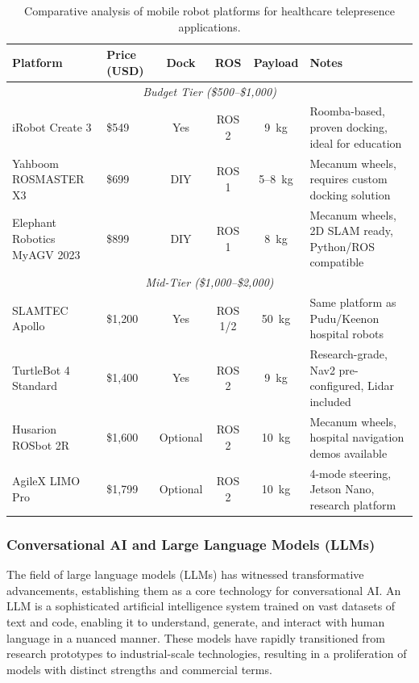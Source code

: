 \begin{table}[H]
\centering
\footnotesize
\begin{tabular}{|p{3.2cm}|l|c|c|c|p{4.5cm}|}
\hline
\textbf{Platform} & \textbf{Price (USD)} & \textbf{Dock} & \textbf{ROS} & \textbf{Payload} & \textbf{Notes} \\
\hline
\multicolumn{6}{|c|}{\textit{Budget Tier (\$500--\$1,000)}} \\
\hline
iRobot Create 3 \cite{irobot2024create3} & \$549 & Yes & ROS 2 & 9~kg & Roomba-based, proven docking, ideal for education \\
\hline
Yahboom ROSMASTER X3 \cite{yahboom2024} & \$699 & DIY & ROS 1 & 5--8~kg & Mecanum wheels, requires custom docking solution \\
\hline
Elephant Robotics MyAGV 2023 \cite{elephantrobotics2024} & \$899 & DIY & ROS 1 & 8~kg & Mecanum wheels, 2D SLAM ready, Python/ROS compatible \\
\hline
\multicolumn{6}{|c|}{\textit{Mid-Tier (\$1,000--\$2,000)}} \\
\hline
SLAMTEC Apollo \cite{slamtec2024} & \$1,200 & Yes & ROS 1/2 & 50~kg & Same platform as Pudu/Keenon hospital robots \\
\hline
TurtleBot 4 Standard \cite{turtlebot2024} & \$1,400 & Yes & ROS 2 & 9~kg & Research-grade, Nav2 pre-configured, Lidar included \\
\hline
Husarion ROSbot 2R \cite{husarion2024} & \$1,600 & Optional & ROS 2 & 10~kg & Mecanum wheels, hospital navigation demos available \\
\hline
AgileX LIMO Pro \cite{agilex2024} & \$1,799 & Optional & ROS 2 & 10~kg & 4-mode steering, Jetson Nano, research platform \\
\hline
\end{tabular}
\caption{Comparative analysis of mobile robot platforms for healthcare telepresence applications.}
\label{tab:platforms}
\end{table}


\subsubsection{Conversational AI and Large Language Models (LLMs)}
\label{sec:llm}
The field of large language models (LLMs) has witnessed transformative advancements, establishing them as a core technology for conversational AI. An LLM is a sophisticated artificial intelligence system trained on vast datasets of text and code, enabling it to understand, generate, and interact with human language in a nuanced manner. These models have rapidly transitioned from research prototypes to industrial-scale technologies, resulting in a proliferation of models with distinct strengths and commercial terms.

